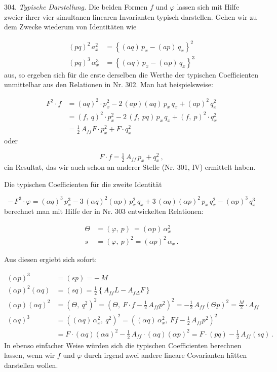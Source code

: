 \documentclass[11pt]{article}
\providecommand{\weberpage}[1]{}
\let\Delta\varDelta
\let\Theta\varTheta
\begin{document}
304. \textit{Typische Darstellung.} Die beiden Formen $f$ und $\varphi$
lassen sich mit Hilfe zweier ihrer vier simultanen linearen Invarianten
typisch darstellen. Gehen wir zu dem Zwecke wiederum von Identitäten wie

\[
\begin{aligned}
(pq)^2\,a_x^2 &= \left\{(aq)\,p_x - (ap)\,q_x\right\}^2\\
(pq)^3\,\alpha_x^3 &= \left\{(\alpha q)\,p_x - (\alpha p)\,q_x\right\}^3
\end{aligned}
\]
aus, so ergeben sich für die erste derselben die Werthe der typischen
Coefficienten unmittelbar aus den Relationen in Nr. 302. Man hat
beispielsweise:

\[
\begin{aligned}
F^2\cdot f &= (aq)^2\cdot p_x^2 - 2\,(ap)(aq)\,p_x\,q_x + (ap)^2\,q_x^2\\
&= (f,\ q)^2\cdot p_x^2 - 2\,(f,\ pq)\,p_x\,q_x + (f,\ p)^2\cdot q_x^2\\
&= \tfrac{1}{2}\,A_{ff}F\cdot p_x^2 + F\cdot q_x^2
\end{aligned}
\]
oder

\[
F\cdot f = \tfrac{1}{2}\,A_{ff}\,p_x + q_x^2\,,
\]
ein Resultat, das wir auch schon an anderer Stelle (Nr. 301, IV) ermittelt
haben.

Die typischen Coefficienten für die zweite Identität

\[
-\,F^3\cdot\varphi = (\alpha q)^3\,p_x^3 - 3\,(\alpha q)^2(\alpha p)\,p_x^2\,q_x + 3\,(\alpha q)(\alpha p)^2\,p_x\,q_x^2 - (\alpha p)^3\,q_x^3
\]
berechnet man mit Hilfe der in Nr. 303 entwickelten Relationen:

\[
\begin{aligned}
\Theta &= (\varphi,\ p)\ = (\alpha p)\,\alpha_x^2\\
s &= (\varphi,\ p)^2 = (\alpha p)^2\,\alpha_x\,.
\end{aligned}
\]


\weberpage{328}
Aus diesen ergiebt sich sofort:

\[
\begin{aligned}
(\alpha p)^3 &= (sp) = -\,M\\
(\alpha p)^2(\alpha q) &= (sq) = \tfrac{1}{2}\left\{A_{ff}L - A_{f\Delta}F\right\}\\
(\alpha p)(\alpha q)^2 &= (\Theta,\ q^2)^2 = \left(\Theta,\ F\cdot f - \tfrac{1}{2}\,A_{ff}p^2\right)^2 = -\tfrac{1}{2}\,A_{ff}(\Theta p)^2 = \tfrac{M}{2}\cdot A_{ff}\\
(\alpha q)^3 &= \left((\alpha q)\,\alpha_x^2,\ q^2\right)^2 = \left((\alpha q)\,\alpha_x^2,\ Ff - \tfrac{1}{2}\,A_{ff}p^2\right)^2\\
&= F\cdot(\alpha q)(\alpha a)^2 - \tfrac{1}{2}\,A_{ff}\cdot(\alpha q)(\alpha p)^2 = F\cdot(pq) - \tfrac{1}{2}\,A_{ff}(sq)\,.
\end{aligned}
\]
In ebenso einfacher Weise würden sich die typischen Coefficienten
berechnen lassen, wenn wir $f$ und $\varphi$ durch irgend zwei andere
lineare Covarianten hätten darstellen wollen.
\end{document}
